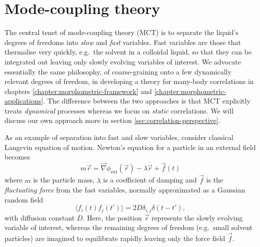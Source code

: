 \documentclass[11pt,twoside]{report}
\begin{document}


\section{Mode-coupling theory}
\label{sec:mct}

The central tenet of mode-coupling theory (MCT) is to separate the liquid's degrees of freedoms into \emph{slow} and \emph{fast} variables.
Fast variables are those that thermalise very quickly, e.g.\ the solvent in a colloidal liquid, so that they can be integrated out leaving only slowly evolving variables of interest.
We advocate essentially the same philosophy, of coarse-graining onto a few dynamically relevant degrees of freedom, in developing a theory for many-body correlations in chapters \ref{chapter:morphometric-framework} and \ref{chapter:morphometric-applications}.
The difference between the two approaches is that MCT explicitly treats \emph{dynamical} processes whereas we focus on \emph{static} correlations.
We will discuss our own approach more in section \ref{sec:correlation-perspective}.

As an example of separation into fast and slow variables, consider classical Langevin equation of motion.
Newton's equation for a particle in an external field becomes
\begin{equation}\label{eq:classical-langevin}
  m \ddot{\vec{r}}
  =
  \vec{\nabla} \phi_\mathrm{ext}(\vec{r})
  - \lambda \dot{\vec{r}} + \vec{f}(t)
\end{equation}
where $m$ is the particle mass, $\lambda$ is a coefficient of damping and $\vec{f}$ is the \emph{fluctuating force} from the fast variables, normally approximated as a Gaussian random field
\begin{equation*}
  \langle f_i(t) f_j(t') \rangle = 2 D \delta_{i,j} \delta(t - t'),
\end{equation*}
with diffusion constant $D$.
Here, the position $\vec{r}$ represents the slowly evolving variable of interest, whereas the remaining degrees of freedom (e.g.\ small solvent particles) are imagined to equilibrate rapidly leaving only the force field $\vec{f}$.
\end{document}

